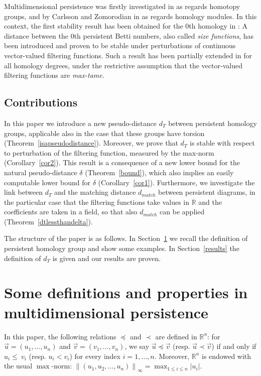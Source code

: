 \documentclass{amsart}
\theoremstyle{definition}
\theoremstyle{remark}
\newcommand{\R}{\mathbb{R}}
\numberwithin{equation}{section}
\begin{document}
Multidimensional persistence was firstly investigated in
\cite{FrMu99} as regards homotopy groups, and by Carlsson and
Zomorodian in \cite{CaZo07} as regards homology modules. In this
context, the first stability result has been obtained for the 0th
homology in \cite{BiCeFrGiLa08}: A distance between the 0th persistent
Betti numbers, also called \emph{size functions}, has been
introduced and proven to be  stable under perturbations of
continuous vector-valued filtering functions. Such a result has
been partially extended in \cite{CaDiFe10} for all homology
degrees, under the restrictive assumption that the vector-valued
filtering functions are \emph{max-tame}.


\subsection*{Contributions}
In this paper we introduce a new pseudo-distance $d_T$ between persistent homology groups, applicable also in the case that these groups have torsion (Theorem~\ref{isapseudodistance}). Moreover, we prove that $d_T$ is stable with respect to perturbation of the filtering function, measured by the max-norm (Corollary~\ref{cor2}). This result is a consequence of a new lower bound for the natural pseudo-distance $\delta$ (Theorem~\ref{bound}), which also implies an easily computable lower bound for $\delta$ (Corollary~\ref{cor1}).
Furthermore, we investigate the link between $d_T$ and the matching distance $d_{match}$ between persistent diagrams, in the particular case that the filtering functions take values in $\R$ and the coefficients are taken in a field, so that also $d_{match}$ can be applied (Theorem~\ref{dtlessthandelta}).

The structure of the paper is as follows. In Section~\ref{basics} we recall the definition of persistent homology group and show some examples.
In Section~\ref{results} the definition of $d_T$ is given and our results are proven.


\section{Some definitions and properties in multidimensional persistence}
\label{basics}

In this paper,
the following relations $\preceq$ and $\prec$ are defined in
$\R^n$: for $\vec u=(u_1,\dots,u_n)$ and $\vec v=(v_1,\dots,v_n)$,
we say $\vec u\preceq\vec v$ (resp. $\vec u\prec\vec v$) if and
only if $u_i\leq\ v_i$ (resp. $u_i<v_i$) for every index
$i=1,\dots,n$. Moreover, $\R^n$ is endowed with the usual
$\max$-norm: $\left\|(u_1,u_2,\dots,u_n)\right\|_{\infty}=\max_{1\leq i\leq
n}|u_i|$.
\end{document}
